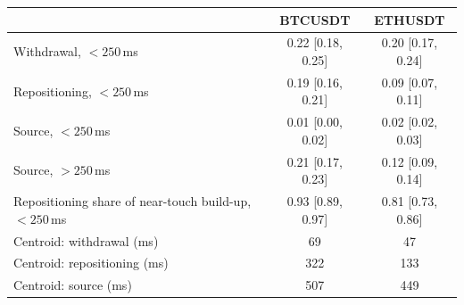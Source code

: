 \begin{tabular}{lcc}
\toprule
 & BTCUSDT & ETHUSDT \\
\midrule
Withdrawal, $<250$\,ms & 0.22 [0.18, 0.25] & 0.20 [0.17, 0.24] \\
Repositioning, $<250$\,ms & 0.19 [0.16, 0.21] & 0.09 [0.07, 0.11] \\
Source, $<250$\,ms & 0.01 [0.00, 0.02] & 0.02 [0.02, 0.03] \\
Source, $>250$\,ms & 0.21 [0.17, 0.23] & 0.12 [0.09, 0.14] \\
Repositioning share of near-touch build-up, $<250$\,ms & 0.93 [0.89, 0.97] & 0.81 [0.73, 0.86] \\
Centroid: withdrawal (ms) & 69 & 47 \\
Centroid: repositioning (ms) & 322 & 133 \\
Centroid: source (ms) & 507 & 449 \\
\bottomrule
\end{tabular}

